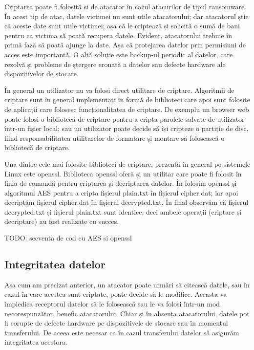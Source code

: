 Criptarea poate fi folosită și de atacator în cazul atacurilor de tipul ransomware. În acest tip de atac, datele victimei nu sunt utile atacatorului; dar atacatorul știe că aceste date sunt utile victimei; așa că le criptează și solicită o sumă de bani pentru ca victima să poată recupera datele. Evident, atacatorului trebuie în primă fază să poată ajunge la date. Așa că protejarea datelor prin permisiuni de acces este importantă. O altă soluție este backup-ul periodic al datelor, care rezolvă și probleme de ștergere eronată a datelor sau defecte hardware ale dispozitivelor de stocare.

În general un utilizator nu va folosi direct utilitare de criptare. Algoritmii de criptare sunt în general implementați în formă de biblioteci care apoi sunt folosite de aplicații care folosesc funcționalitatea de criptare. De exemplu un browser web poate folosi o bibliotecă de criptare pentru a cripta parolele salvate de utilizator într-un fișier local; sau un utilizator poate decide să își cripteze o partiție de disc, fiind responsabilitatea utilitarelor de formatare și montare să folosească o bibliotecă de criptare.

Una dintre cele mai folosite biblioteci de criptare, prezentă în general pe sistemele Linux este openssl. Biblioteca openssl oferă și un utilitar care poate fi folosit în linia de comandă pentru criptarea și decriptarea datelor. În  folosim openssl și algoritmul AES pentru a cripta fișierul plain.txt în fișierul cipher.dat; iar apoi decriptăm fișierul cipher.dat în fișierul decrypted.txt. În final observăm că fișierul decrypted.txt și fișierul plain.txt sunt identice, deci ambele operații (criptare și decriptare) au fost realizate cu succes.

\begin{screen}[caption={Criptare și decriptare folosind openssl},label={lst:sec:openssl}]
TODO: secventa de cod cu AES si openssl
\end{screen}

\subsection{Integritatea datelor}
\label{sec:sec:integrity}

Așa cum am precizat anterior, un atacator poate urmări să citească datele, sau în cazul în care acestea sunt criptate, poate decide să le modifice. Aceasta va împiedica receptorul datelor să le folosească sau le va folosi într-un mod necorespunzător, benefic atacatorului. Chiar și în absența atacatorului, datele pot fi corupte de defecte hardware pe dispozitivele de stocare sau în momentul transferului. De aceea este necesar ca în cazul transferului datelor să asigurăm integritatea acestora.

